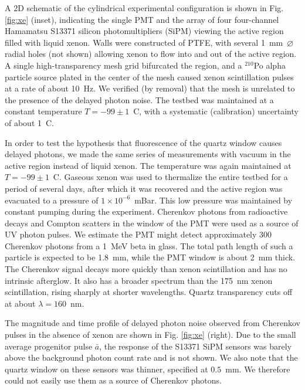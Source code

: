 \documentclass[%
 reprint,
superscriptaddress,
nofootinbib,
 amsmath,amssymb,
 aps,
prl,
]{revtex4-2}
\begin{document}
A 2D schematic of the cylindrical experimental configuration is shown in Fig. \ref{fig:xe} (inset), indicating the single PMT and the array of four four-channel Hamamatsu S13371 silicon photomultipliers (SiPM) viewing the active region filled with liquid xenon. Walls were constructed of PTFE, with several 1~mm~$\varnothing$ radial holes (not shown) allowing xenon to flow into and out of the active region. A single high-transparency mesh grid  bifurcated the region, and a $^{210}$Po alpha particle source plated in the center of the mesh caused xenon scintillation pulses at a rate of about 10~Hz. We verified (by removal) that the mesh is unrelated to the presence of the delayed photon noise. The testbed was maintained at a constant temperature $T=-99\pm1$~C, with a systematic (calibration) uncertainty of about 1~C. 

In order to test the hypothesis that fluorescence of the quartz window causes delayed photons, we made the same series of measurements with vacuum in the active region instead of liquid xenon.  The temperature was again maintained at $T=-99\pm1$~C. Gaseous xenon was used to thermalize the entire testbed for a period of several days, after which it was recovered and the active region was evacuated to a pressure of $1\times10^{-6}$~mBar. This low pressure was maintained by constant pumping during the experiment. Cherenkov photons from radioactive decays and Compton scatters in the window of the PMT were used as a source of UV photon pulses. We estimate the PMT might detect approximately 300 Cherenkov photons from a 1~MeV beta in glass. The total path length of such a particle is  expected to be 1.8~mm, while the PMT window is about 2~mm thick. The Cherenkov signal decays more quickly than xenon scintillation and has no intrinsic afterglow. It also has a broader spectrum than the 175~nm xenon scintillation, rising sharply at shorter wavelengths. Quartz transparency cuts off at about $\lambda=160$~nm.

The magnitude and time profile of delayed photon noise observed from Cherenkov pulses in the absence of xenon are shown in Fig. \ref{fig:xe} (right). Due to the small average progenitor pulse $\bar{a}$, the response of the S13371 SiPM sensors was barely above the background photon count rate and is not shown. We also note that the quartz window on these sensors was thinner, specified at $0.5$~mm. We therefore could not easily use them as a source of Cherenkov photons. 
\end{document}
